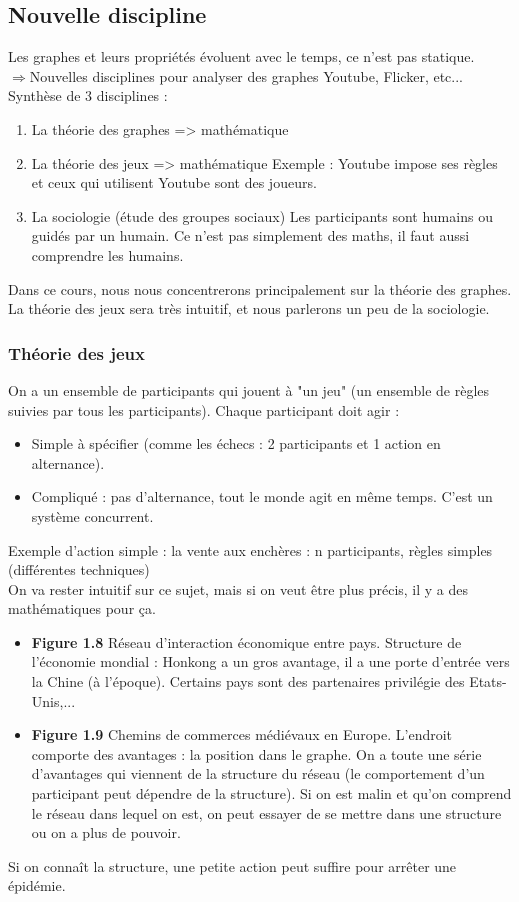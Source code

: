 \subsection{Nouvelle discipline}
Les graphes et leurs propriétés évoluent avec le temps, ce n'est pas statique.\\
$\Rightarrow$Nouvelles disciplines pour analyser des graphes Youtube, Flicker, etc...\\
Synthèse de 3 disciplines :
\begin{enumerate}

	\item La théorie des graphes => mathématique
	\item La théorie des jeux => mathématique
		Exemple : Youtube impose ses règles et ceux qui utilisent Youtube sont des joueurs.
	\item La sociologie (étude des groupes sociaux) Les participants sont humains ou guidés par  un 	    humain. Ce n'est pas simplement des maths, il faut aussi comprendre les humains.\\
\end{enumerate}
Dans ce cours, nous nous concentrerons principalement sur la théorie des graphes. La théorie des jeux sera très intuitif, et nous parlerons un peu de la sociologie.
\subsubsection{Théorie des jeux}
On a un ensemble de participants qui jouent à "un jeu" (un ensemble de règles suivies par tous les participants). Chaque participant doit agir : 
\begin{itemize}

\item Simple à spécifier (comme les échecs : 2 participants et 1 action en alternance). 
\item Compliqué : pas d'alternance, tout le monde agit en même temps. C'est un système concurrent.
\end{itemize}
Exemple d'action simple : la vente aux enchères : 
	n participants,
	règles simples (différentes techniques) \\
	
On va rester intuitif sur ce sujet, mais si on veut être plus précis, il y a des mathématiques pour ça.
\begin{itemize}

\item \textbf{Figure 1.8} Réseau d'interaction économique entre pays. Structure de l'économie mondial : Honkong a un gros avantage, il a une porte d'entrée vers la Chine (à l'époque). Certains pays sont des partenaires privilégie des Etats-Unis,... 
\item \textbf{Figure 1.9} Chemins de commerces médiévaux en Europe. L'endroit comporte des avantages : la position dans le graphe. On a toute une série d'avantages qui viennent de la structure du réseau (le comportement d'un participant peut dépendre de la structure). Si on est malin et qu'on comprend le réseau dans lequel on est, on peut essayer de se mettre dans une structure ou on a plus de pouvoir. 
\end{itemize}
Si on connaît la structure, une petite action peut suffire pour arrêter une épidémie.

